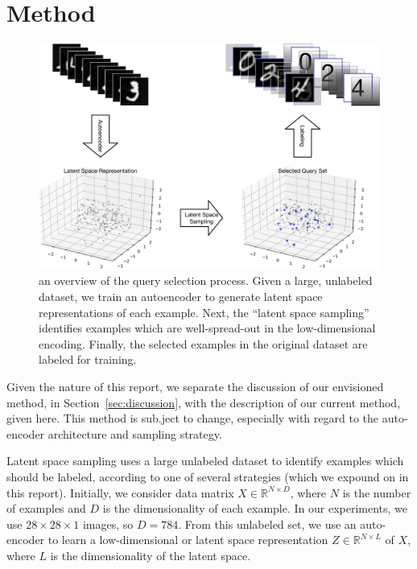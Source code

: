 \documentclass[a4paper]{article}
\begin{document}
\section{Method}
\label{sec:method}

\begin{figure}
  \centering
  \includegraphics[width=0.9\linewidth]{overview}
  \caption{an overview of the query selection process. Given a large, unlabeled
    dataset, we train an autoencoder to generate latent space representations of
    each example. Next, the ``latent space sampling'' identifies examples which
    are well-spread-out in the low-dimensional encoding. Finally, the selected
    examples in the original dataset are labeled for training.}
  \label{fig:overview}
\end{figure}

Given the nature of this report, we separate the discussion of our envisioned
method, in Section~\ref{sec:discussion}, with the description of our current
method, given here. This method is sub.ject to change, especially with regard to
the auto-encoder architecture and sampling strategy.

Latent space sampling uses a large unlabeled dataset to identify examples which
should be labeled, according to one of several strategies (which we expound on
in this report). Initially, we consider data matrix
$X \in \mathbb{R}^{N\times D}$, where $N$ is the number of examples and $D$ is
the dimensionality of each example. In our experiments, we use
$28 \times 28 \times 1$ images, so $D = 784$. From this unlabeled set, we use an
auto-encoder to learn a low-dimensional or latent space representation
$Z \in \mathbb{R}^{N\times L}$ of $X$, where $L$ is the dimensionality of the
latent space.
\end{document}

